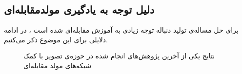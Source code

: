 \subsection{دلیل توجه به یادگیری مولدمقابله‌ای}
برای حل مساله‌ی تولید دنباله توجه زیادی به آموزش مقابله‌ای شده است
\cite{kusner2016gans,lamb2016professor,Zhang2017TextGAN,SeqGAN,ORGAN,lin2017adversarial,Guo2018,Che2017,press2017langwasserstein}،
در ادامه دلایلی برای این موضوع ذکر می‌کنیم.
	\begin{figure}[!htb]
		{
			\begin{center}
				\hspace{1cm}
				\end{center}
			\caption[نتایج یکی از آخرین پژوهش‌های انجام شده در حوزه‌ی تصویر با کمک شبکه‌های مولد مقابله‌ای]{
				نتایج یکی از آخرین پژوهش‌های انجام شده در حوزه‌ی تصویر با کمک شبکه‌های مولد مقابله‌ای
				\cite{karras2018style}
			}
			\label{Figure:NVIDIAGAN:SampleAndLatent}
		}
		\end{figure}

